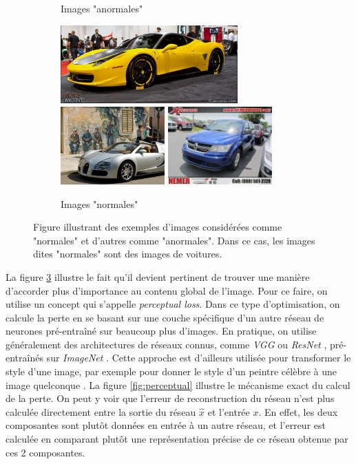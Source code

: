 \begin{figure} [htb]
\begin{subfigure}{.33\textwidth}
		\caption{Images "anormales"}
		\label{fig:sfig2}
	\end{subfigure}
	\begin{subfigure}{.33\textwidth}
		\centering
		\includegraphics[width=.8\linewidth,height=3cm]{images/images_anomalies/inlier-4}
		\includegraphics[width=.8\linewidth,height=3cm]{images/images_anomalies/inlier-5}
		\includegraphics[width=.8\linewidth,height=3cm]{images/images_anomalies/inlier-6}
		\caption{Images "normales"}
		\label{fig:sfig3}
	\end{subfigure}
	\centering
	\caption{Figure illustrant des exemples d'images considérées comme "normales" et d'autres comme "anormales". Dans ce cas, les images dites "normales" sont des images de voitures.}
	\label{fig:exemple_global}
\end{figure}

 La figure \ref{fig:exemple_global} illustre le fait qu'il devient pertinent de trouver une manière d'accorder plus d'importance au contenu global de l'image. Pour ce faire, on utilise un concept qui s'appelle \textit{perceptual loss}. Dans ce type d'optimisation, on calcule la perte en se basant sur une couche spécifique d'un autre réseau de neurones pré-entraîné sur beaucoup plus d'images. En pratique, on utilise généralement des architectures de réseaux connus,  comme \textit{VGG} \citep{DBLP:journals/corr/SimonyanZ14a}  ou \textit{ResNet} \citep{DBLP:journals/corr/HeZRS15}, pré-entraînés sur \textit{ImageNet} \citep{deng2009imagenet}. Cette approche est d'ailleurs utilisée pour transformer le style d'une image, par exemple pour donner le style d'un peintre célèbre à une image quelconque \citep{Johnson2016Perceptual}. La figure \ref{fig:perceptual} illustre le mécanisme exact du calcul de la perte. On peut y voir que l'erreur de reconstruction du réseau n'est plus calculée directement entre la sortie du réseau $\hat{x}$ et l'entrée $x$. En effet, les deux composantes sont plutôt données en entrée à un autre réseau, et l'erreur est calculée en comparant plutôt une représentation précise de ce réseau obtenue par ces 2 composantes.

